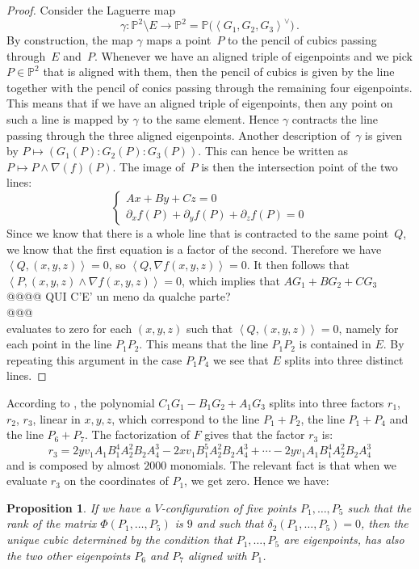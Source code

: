 \documentclass[11pt, a4paper, reqno, captions=tableheading,bibliography=totoc]{scrartcl}
\theoremstyle{plain}
\newtheorem{prop}[lemma]{Proposition}
\theoremstyle{definition}
\newcommand{\p}{\mathbb{P}}
\begin{document}
\begin{proof}
Consider the Laguerre map
%
\[
 \gamma \colon \p^2 \setminus E \longrightarrow \p^2 =
 \p \bigl( \left\langle G_1, G_2, G_3 \right\rangle^\vee \bigr) \,.
\]
%
By construction, the map $\gamma$ maps a point~$P$ to the pencil of cubics passing through~$E$ and~$P$.
Whenever we have an aligned triple of eigenpoints and we pick $P \in \p^2$ that is aligned with them, then the pencil of cubics is given by the line together with the pencil of conics passing through the remaining four eigenpoints.
This means that if we have an aligned triple of eigenpoints, then any point on such a line is mapped by $\gamma$ to the same element.
Hence $\gamma$ contracts the line passing through the three aligned eigenpoints.
Another description of~$\gamma$ is given by $P \mapsto (G_1(P): G_2(P): G_3(P))$.
This can hence be written as $P \mapsto P \wedge \nabla(f)(P)$.
The image of~$P$ is then the intersection point of the two lines:
%
\[
 \left\{
 \begin{array}{l}
  A x + B y + Cz  = 0\\
  \partial_x f(P) + \partial_y f (P) + \partial_z f(P) = 0
 \end{array}
 \right.
\]
%
Since we know that there is a whole line that is contracted to the same point~$Q$,
we know that the first equation is a factor of the second.
Therefore we have $\left\langle Q, (x,y,z) \right\rangle = 0$, so $\left\langle Q, \nabla f (x,y,z) \right\rangle = 0$.
It then follows that $\left\langle P, (x, y, z) \wedge \nabla f(x,y,z) \right\rangle = 0$, which implies that $A G_1 + B G_2 + C G_3$
\\
@@@@
QUI C'E' un meno da qualche parte? \\
@@@\\
evaluates to zero for each $(x,y,z)$ such that $\left\langle Q, (x,y,z) \right\rangle= 0$, namely for each point in the line $P_1 P_2$.
This means that the line $P_1 P_2$ is contained in $E$.
By repeating this argument in the case $P_1 P_4$ we see that $E$ splits into three distinct lines.
\end{proof}

According to , the polynomial
$C_1G_1-B_1G_2+A_1G_3$ splits into three factors $r_1$, $r_2$, $r_3$,
linear in $x, y, z$, which
correspond to the line $P_1+P_2$, the line $P_1+P_4$ and the line $P_6+P_7$.
The factorization of $F$ gives that the factor $r_3$ is:
\[
r_3 = 2yv_1A_1B_1^4A_2^2B_2A_4^3-2xv_1B_1^5A_2^2B_2A_4^3+\cdots
-2 yv_1A_1B_1^4A_2^2B_2A_4^3
\]
and is composed by almost $2000$ monomials. The relevant fact is that when we
evaluate $r_3$ on the coordinates of $P_1$, we get zero. Hence we have:
\begin{prop}
\label{proposition:terzo_allineamento}
If we have a $V$-configuration of five points $P_1, \dots, P_5$ 
such that the rank of the matrix $\Phi(P_1, \dots, P_5)$ is $9$ and
such that $\delta_2(P_1, \dots, P_5) = 0$,
then the unique cubic determined by the condition that $P_1, \dots, P_5$
are eigenpoints, has also the two other eigenpoints $P_6$ and $P_7$
aligned with $P_1$.
\end{prop}
\end{document}
